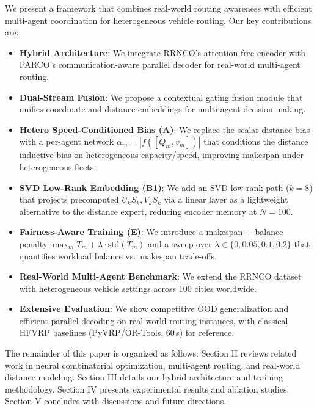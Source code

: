 \documentclass[journal,twoside,web]{ieeecolor}
\theoremstyle{definition}
\theoremstyle{remark}
\theoremstyle{definition}
\begin{document}
We present a framework that combines real-world routing awareness with efficient multi-agent coordination for heterogeneous vehicle routing. Our key contributions are:

\begin{itemize}
    \item \textbf{Hybrid Architecture}: We integrate RRNCO's attention-free encoder with PARCO's communication-aware parallel decoder for real-world multi-agent routing.

    \item \textbf{Dual-Stream Fusion}: We propose a contextual gating fusion module that unifies coordinate and distance embeddings for multi-agent decision making.

    \item \textbf{Hetero Speed-Conditioned Bias (A)}: We replace the scalar distance bias with a per-agent network $\alpha_m{=}|f([Q_m,v_m])|$ that conditions the distance inductive bias on heterogeneous capacity/speed, improving makespan under heterogeneous fleets.

    \item \textbf{SVD Low-Rank Embedding (B1)}: We add an SVD low-rank path ($k{=}8$) that projects precomputed $U_kS_k,V_kS_k$ via a linear layer as a lightweight alternative to the distance expert, reducing encoder memory at $N{=}100$.

    \item \textbf{Fairness-Aware Training (E)}: We introduce a makespan $+$ balance penalty $\max_m T_m + \lambda\cdot \mathrm{std}(T_m)$ and a sweep over $\lambda\in\{0,0.05,0.1,0.2\}$ that quantifies workload balance vs.\ makespan trade-offs.

    \item \textbf{Real-World Multi-Agent Benchmark}: We extend the RRNCO dataset with heterogeneous vehicle settings across 100 cities worldwide.

    \item \textbf{Extensive Evaluation}: We show competitive OOD generalization and efficient parallel decoding on real-world routing instances, with classical HFVRP baselines (PyVRP/OR-Tools, 60\,s) for reference.
\end{itemize}

The remainder of this paper is organized as follows: Section II reviews related work in neural combinatorial optimization, multi-agent routing, and real-world distance modeling. Section III details our hybrid architecture and training methodology. Section IV presents experimental results and ablation studies. Section V concludes with discussions and future directions.
\end{document}

